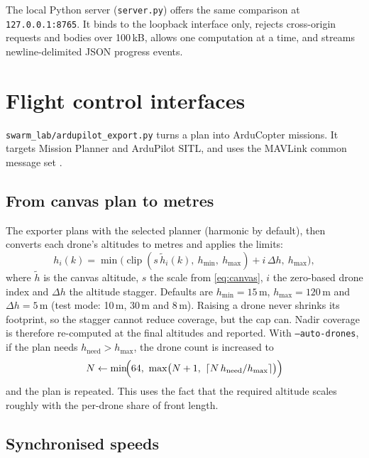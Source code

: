 \documentclass[11pt,a4paper]{article}
\newcommand{\code}[1]{\texttt{#1}}
\begin{document}
The local Python server (\code{server.py}) offers the same comparison at \code{127.0.0.1:8765}. It binds to
the loopback interface only, rejects cross-origin requests and bodies over 100\,kB, allows one computation
at a time, and streams newline-delimited JSON progress events.

\section{Flight control interfaces}
\label{sec:flight}

\code{swarm\_lab/ardupilot\_export.py} turns a plan into ArduCopter missions. It targets Mission Planner and
ArduPilot SITL, and uses the MAVLink common message set \cite{mavlink,ardupilot}.

\subsection{From canvas plan to metres}

The exporter plans with the selected planner (harmonic by default), then converts each drone's altitudes
to metres and applies the limits:
\begin{equation}
h_i(k) = \min\!\bigl(\operatorname{clip}(s\,\tilde h_i(k),\ h_{\min},\ h_{\max}) + i\,\Delta h,\ h_{\max}\bigr),
\end{equation}
where $\tilde h$ is the canvas altitude, $s$ the scale from \eqref{eq:canvas}, $i$ the zero-based drone
index and $\Delta h$ the altitude stagger. Defaults are $h_{\min}=15$\,m, $h_{\max}=120$\,m and
$\Delta h=5$\,m (test mode: 10\,m, 30\,m and 8\,m). Raising a drone never shrinks its footprint, so the
stagger cannot reduce coverage, but the cap can. Nadir coverage is therefore re-computed at the final
altitudes and reported. With \code{--auto-drones}, if the plan needs $h_{\text{need}} > h_{\max}$, the
drone count is increased to
\begin{equation}
N \leftarrow \min\!\Bigl(64,\ \max\bigl(N+1,\ \lceil N\,h_{\text{need}}/h_{\max}\rceil\bigr)\Bigr)
\end{equation}
and the plan is repeated. This uses the fact that the required altitude scales roughly with the per-drone
share of front length.

\subsection{Synchronised speeds}
\end{document}
